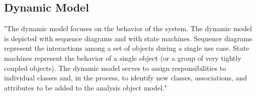 \subsection{Dynamic Model}
"The dynamic model focuses on the behavior of the system. The dynamic model is
depicted with sequence diagrams and with state machines. Sequence diagrams represent the
interactions among a set of objects during a single use case. State machines represent the
behavior of a single object (or a group of very tightly coupled objects). The dynamic model
serves to assign responsibilities to individual classes and, in the process, to identify new classes,
associations, and attributes to be added to the analysis object model."